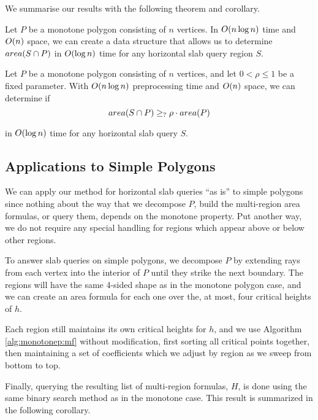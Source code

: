 \noindent
We summarise our results with the following theorem and corollary.

\begin{theorem}
\label{th:montonep:slab-area}
Let $P$ be a monotone polygon consisting of $n$ vertices. In $O\!\left(n \log{n}\right)$ time and $O\!\left(n\right)$ space, we can create a data structure that allows us to determine $area(S \cap P)$ in $O\!\left(\log{n}\right)$ time for any horizontal slab query region $S$.
\end{theorem}

\begin{corollary}
\label{cor:montonep:slab-mp}
Let $P$ be a monotone polygon consisting of $n$ vertices, and let $0 < \rho \leq 1$ be a fixed parameter. With $O\!\left(n \log{n}\right)$ preprocessing time and $O\!\left(n\right)$ space, we can determine if 
\[ 
area(S \cap P) \geq_{?} \rho \cdot area(P)
\] 

\noindent in $O\!\left(\log{n}\right)$ time for any horizontal slab query $S$.
\end{corollary}


\subsection{Applications to Simple Polygons}
\label{:monotonep:slab:simplep}

We can apply our method for horizontal slab queries ``as is'' to simple polygons since nothing about the way that we decompose $P$, build the multi-region area formulas, or query them, depends on the monotone property.  Put another way, we do not require any special handling for regions which appear above or below other regions.

To answer slab queries on simple polygons, we decompose $P$ by extending rays from each vertex into the interior of $P$ until they strike the next boundary.  The regions will have the same 4-sided shape as in the monotone polygon case, and we can create an area formula for each one over the, at most, four critical heights of $h$.

Each region still maintains its own critical heights for $h$, and we use Algorithm \ref{alg:monotonep:mf} without modification, first sorting all critical points together, then maintaining a set of coefficients which we adjust by region as we sweep from bottom to top.

Finally, querying the resulting list of multi-region formulas, $H$, is done using the same binary search method as in the monotone case. This result is summarized in the following corollary.

